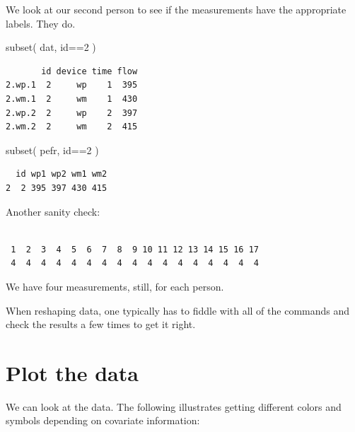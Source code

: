 \documentclass[
  letterpaper,
  DIV=11,
  numbers=noendperiod]{scrreprt}
\newenvironment{Shaded}{\begin{snugshade}}{\end{snugshade}}
\newcommand{\DecValTok}[1]{\textcolor[rgb]{0.25,0.63,0.44}{#1}}
\newcommand{\FunctionTok}[1]{\textcolor[rgb]{0.02,0.16,0.49}{#1}}
\newcommand{\NormalTok}[1]{\textcolor[rgb]{0.00,0.44,0.13}{#1}}
\newcommand{\SpecialCharTok}[1]{\textcolor[rgb]{0.25,0.44,0.63}{#1}}
\begin{document}
We look at our second person to see if the measurements have the
appropriate labels. They do.

\begin{Shaded}
\begin{Highlighting}[]
\FunctionTok{subset}\NormalTok{( dat, id}\SpecialCharTok{==}\DecValTok{2}\NormalTok{ )}
\end{Highlighting}
\end{Shaded}

\begin{verbatim}
       id device time flow
2.wp.1  2     wp    1  395
2.wm.1  2     wm    1  430
2.wp.2  2     wp    2  397
2.wm.2  2     wm    2  415
\end{verbatim}

\begin{Shaded}
\begin{Highlighting}[]
\FunctionTok{subset}\NormalTok{( pefr, id}\SpecialCharTok{==}\DecValTok{2}\NormalTok{ )}
\end{Highlighting}
\end{Shaded}

\begin{verbatim}
  id wp1 wp2 wm1 wm2
2  2 395 397 430 415
\end{verbatim}

Another sanity check:

\begin{Shaded}
\end{Shaded}

\begin{verbatim}

 1  2  3  4  5  6  7  8  9 10 11 12 13 14 15 16 17 
 4  4  4  4  4  4  4  4  4  4  4  4  4  4  4  4  4 
\end{verbatim}

We have four measurements, still, for each person.

When reshaping data, one typically has to fiddle with all of the
commands and check the results a few times to get it right.

\hypertarget{plot-the-data}{%
\section{Plot the data}\label{plot-the-data}}

We can look at the data. The following illustrates getting different
colors and symbols depending on covariate information:
\end{document}
